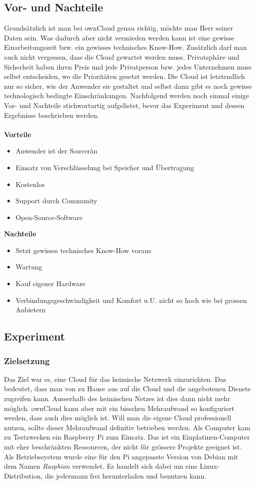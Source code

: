 \subsection{Vor- und Nachteile}
Grundsätzlich ist man bei ownCloud genau richtig, möchte man Herr seiner Daten sein. Was dadurch aber nicht vermieden werden kann ist eine gewisse Einarbeitungszeit bzw. ein gewisses technisches Know-How. Zusätzlich darf man auch nicht vergessen, dass die Cloud gewartet werden muss. Privatsphäre und Sicherheit haben ihren Preis und jede Privatperson bzw. jedes Unternehmen muss selbst entscheiden, wo die Prioritäten gesetzt werden. Die Cloud ist letztendlich nur so sicher, wie der Anwender sie gestaltet und selbst dann gibt es noch gewisse technologisch bedingte Einschränkungen.
Nachfolgend werden noch einmal einige Vor- und Nachteile stichwortartig aufgelistet, bevor das Experiment und dessen Ergebnisse beschrieben werden.
\\
\\

\textbf{Vorteile}
\begin{itemize}
\item Anwender ist der Souverän
\item Einsatz von Verschlüsselung bei Speicher und Übertragung
\item Kostenlos
\item Support durch Community
\item Open-Source-Software
\end{itemize}

\textbf{Nachteile}
\begin{itemize}
\item Setzt gewisses technisches Know-How voraus
\item Wartung
\item Kauf eigener Hardware
\item Verbindungsgeschwindigkeit und Komfort u.U. nicht so hoch wie bei grossen Anbietern
\end{itemize}

\subsection{Experiment}

\subsubsection{Zielsetzung}
Das Ziel war es, eine Cloud für das heimische Netzwerk einzurichten. Das bedeutet, dass man von zu Hause aus auf die Cloud und die angebotenen Dienste zugreifen kann. Ausserhalb des heimischen Netzes ist dies dann nicht mehr möglich. ownCloud kann aber mit ein bisschen Mehraufwand so konfiguriert werden, dass auch dies möglich ist. Will man die eigene Cloud professionell nutzen, sollte dieser Mehraufwand definitiv betrieben werden. Als Computer kam zu Testzwecken ein Raspberry Pi zum Einsatz. Das ist ein Einplatinen-Computer mit eher beschränkten Ressourcen, der nicht für grössere Projekte geeignet ist. Als Betriebssystem wurde eine für den Pi angepasste Version von Debian mit dem Namen \textit{Raspbian} verwendet. Es handelt sich dabei um eine Linux-Distribution, die jedermann frei herunterladen und benutzen kann.


